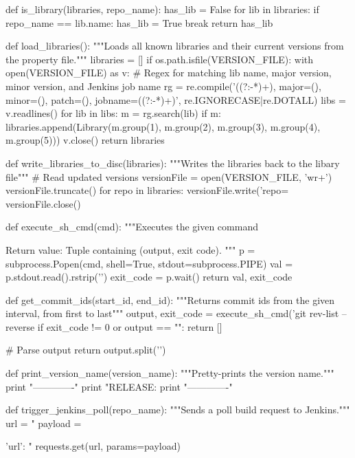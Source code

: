 \begin{pythoncode}[caption=Post-update git hook for managing library releases and triggering Jenkins]
def is_library(libraries, repo_name):
    has_lib = False
    for lib in libraries:
        if repo_name == lib.name:
            has_lib = True
            break
    return has_lib

def load_libraries():
    """Loads all known libraries and their current versions from the property file."""
    libraries = []
    if os.path.isfile(VERSION_FILE):
        with open(VERSION_FILE) as v:
            # Regex for matching lib name, major version, minor version, and Jenkins job name
            rg = re.compile('((?:\w*-*)+), major=(\d*), minor=(\d*), patch=(\d*), jobname=((?:\w*-*)+)', re.IGNORECASE|re.DOTALL)
            libs = v.readlines()
            for lib in libs:
                m = rg.search(lib)
                if m:
                    libraries.append(Library(m.group(1), m.group(2), m.group(3), m.group(4), m.group(5)))
            v.close()
    return libraries

def write_libraries_to_disc(libraries):
    """Writes the libraries back to the libary file"""
    # Read updated versions
    versionFile = open(VERSION_FILE, 'wr+')
    versionFile.truncate()
    for repo in libraries:
        versionFile.write('repo=%
    versionFile.close()

def execute_sh_cmd(cmd):
    """Executes the given command

    Return value: Tuple containing (output, exit code).
    """
    p = subprocess.Popen(cmd, shell=True, stdout=subprocess.PIPE)
    val = p.stdout.read().rstrip('\n')
    exit_code = p.wait()
    return val, exit_code

def get_commit_ids(start_id, end_id):
    """Returns commit ids from the given interval, from first to last"""
    output, exit_code = execute_sh_cmd('git rev-list --reverse %
    if exit_code != 0 or output == "":
        return []

    # Parse output
    return output.split('\n')


def print_version_name(version_name):
    """Pretty-prints the version name."""
    print "-------------"
    print "RELEASE: %
    print "-------------"

def trigger_jenkins_poll(repo_name):
    """Sends a poll build request to Jenkins."""
    url = "%
    payload = {'url': "%
    requests.get(url, params=payload)

}
\end{pythoncode}
